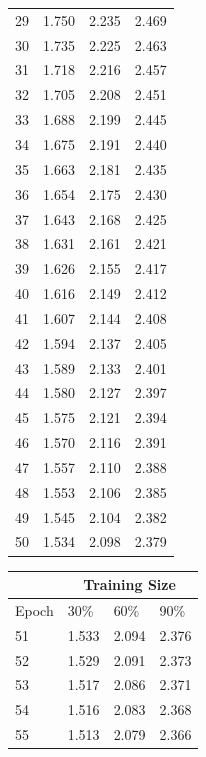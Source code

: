 \documentclass[12pt]{article}
\begin{document}
\begin{center}
\begin{tabular}{|l || l| l| l|}
            29 & 1.750 & 2.235 & 2.469 \\
            30 & 1.735 & 2.225 & 2.463 \\
            31 & 1.718 & 2.216 & 2.457 \\
            32 & 1.705 & 2.208 & 2.451 \\
            33 & 1.688 & 2.199 & 2.445 \\
            34 & 1.675 & 2.191 & 2.440 \\
            35 & 1.663 & 2.181 & 2.435 \\
            36 & 1.654 & 2.175 & 2.430 \\
            37 & 1.643 & 2.168 & 2.425 \\
            38 & 1.631 & 2.161 & 2.421 \\
            39 & 1.626 & 2.155 & 2.417 \\
            40 & 1.616 & 2.149 & 2.412 \\
            41 & 1.607 & 2.144 & 2.408 \\
            42 & 1.594 & 2.137 & 2.405 \\
            43 & 1.589 & 2.133 & 2.401 \\
            44 & 1.580 & 2.127 & 2.397 \\
            45 & 1.575 & 2.121 & 2.394 \\
            46 & 1.570 & 2.116 & 2.391 \\
            47 & 1.557 & 2.110 & 2.388 \\
            48 & 1.553 & 2.106 & 2.385 \\
            49 & 1.545 & 2.104 & 2.382 \\
            50 & 1.534 & 2.098 & 2.379 \\
            \hline
          \end{tabular}
          \begin{tabular}{|l || l| l| l|}
            \hline
            &\multicolumn{3}{|c|}{Training Size} \\
            \hline
            Epoch & 30\% & 60\% & 90\% \\
            \hline
            51 & 1.533 & 2.094 & 2.376 \\
            52 & 1.529 & 2.091 & 2.373 \\
            53 & 1.517 & 2.086 & 2.371 \\
            54 & 1.516 & 2.083 & 2.368 \\
            55 & 1.513 & 2.079 & 2.366 \\

\end{tabular}
\end{center}
\end{document}
